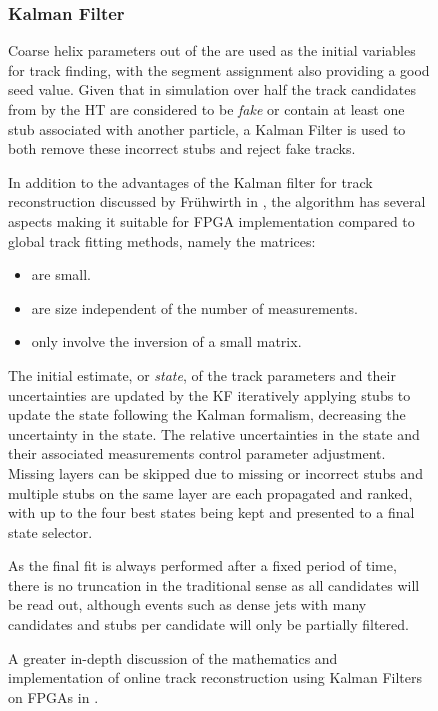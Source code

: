 \begin{figure}[tb]
\subsubsection{Kalman Filter}
Coarse \rphi helix parameters out of the \HT are used as the initial variables for track finding, with the segment assignment also providing a good seed value.
Given that in simulation over half the track candidates from by the HT are considered to be \textit{fake} or contain at least one stub associated with another particle, a Kalman Filter is used to both remove these incorrect stubs and reject fake tracks. 

In addition to the advantages of the Kalman filter for track reconstruction discussed by Fr{\"u}hwirth in \cite{Fruhwirth:1987fm}, the algorithm has several aspects making it suitable for FPGA implementation compared to global track fitting methods, namely the matrices:

\begin{itemize}
\item {are small.}
\item {are size independent of the number of measurements.}
\item {only involve the inversion of a small matrix.}
\end{itemize}

The initial estimate, or \textit{state}, of the track parameters and their uncertainties are updated by the KF iteratively applying stubs to update the state following the Kalman formalism, decreasing the uncertainty in the state. 
The relative uncertainties in the state and their associated measurements control parameter adjustment.
Missing layers can be skipped due to missing or incorrect stubs and multiple stubs on the same layer are each propagated and ranked, with up to the four best states being kept and presented to a final state selector.

As the final fit is always performed after a fixed period of time, there is no truncation in the traditional sense as all candidates will be read out, although events such as dense jets with many candidates and stubs per candidate will only be partially filtered.

A greater in-depth discussion of the mathematics and implementation of online track reconstruction using Kalman Filters on FPGAs in \cite{SSummers}.


\end{figure}
